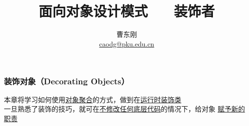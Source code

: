 \documentclass[compress]{beamer}
\begin{document}

					
\title[装饰者模式]{面向对象设计模式 ~~ 装饰者}

\author[曹东刚]
{曹东刚\\\href{mailto:caodg@pku.edu.cn}{caodg@pku.edu.cn}}


\date{}


\begin{frame}[plain]
	\titlepage
\end{frame}

\setcounter{framenumber}{0}


\begin{frame}
  \frametitle{装饰对象（Decorating Objects）}
  本章将学习如何使用\uline{对象聚合}的方式，做到在\uline{运行时装饰类}
  \\[3ex]
  一旦熟悉了装饰的技巧，就可在\uline{不修改任何底层代码}的情况下，给对象
  \uline{赋予新的职责} \\[6ex]

  
\end{frame}
\end{document}

